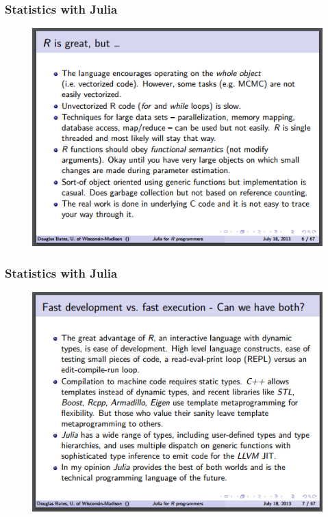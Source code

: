 \documentclass[Master.tex]{subfiles}
\begin{document}
\begin{frame}[fragile]
	\frametitle{Statistics with Julia}
	\large
\begin{figure}
\centering
\includegraphics[width=0.98\linewidth]{images/Dougbates-R1}
\caption{}
\label{fig:Dougbates-R1}
\end{figure}




\end{frame}
\begin{frame}[fragile]
	\frametitle{Statistics with Julia}
	\large

\begin{figure}
	\centering
	\includegraphics[width=0.98\linewidth]{images/Dougbates-R2}
	\caption{}
	\label{fig:Dougbates-R2}
\end{figure}

\end{frame}
\end{document}
